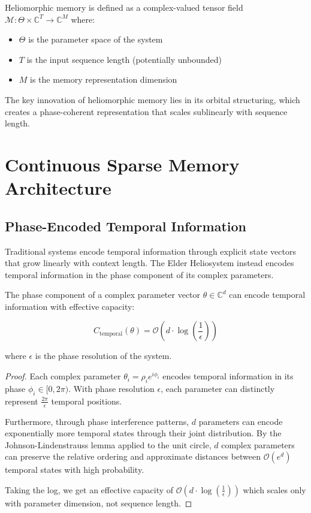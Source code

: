 \begin{definition}
Heliomorphic memory is defined as a complex-valued tensor field $\mathcal{M}: \Theta \times \mathbb{C}^T \rightarrow \mathbb{C}^M$ where:
\begin{itemize}
    \item $\Theta$ is the parameter space of the system
    \item $T$ is the input sequence length (potentially unbounded)
    \item $M$ is the memory representation dimension
\end{itemize}
\end{definition}

The key innovation of heliomorphic memory lies in its orbital structuring, which creates a phase-coherent representation that scales sublinearly with sequence length.

\section{Continuous Sparse Memory Architecture}

\subsection{Phase-Encoded Temporal Information}

Traditional systems encode temporal information through explicit state vectors that grow linearly with context length. The Elder Heliosystem instead encodes temporal information in the phase component of its complex parameters.

\begin{theorem}
The phase component of a complex parameter vector $\theta \in \mathbb{C}^d$ can encode temporal information with effective capacity:

\begin{equation}
C_{\text{temporal}}(\theta) = \mathcal{O}(d \cdot \log(\frac{1}{\epsilon}))
\end{equation}

where $\epsilon$ is the phase resolution of the system.
\end{theorem}

\begin{proof}
Each complex parameter $\theta_i = \rho_i e^{i\phi_i}$ encodes temporal information in its phase $\phi_i \in [0, 2\pi)$. With phase resolution $\epsilon$, each parameter can distinctly represent $\frac{2\pi}{\epsilon}$ temporal positions.

Furthermore, through phase interference patterns, $d$ parameters can encode exponentially more temporal states through their joint distribution. By the Johnson-Lindenstrauss lemma applied to the unit circle, $d$ complex parameters can preserve the relative ordering and approximate distances between $\mathcal{O}(e^{d})$ temporal states with high probability.

Taking the log, we get an effective capacity of $\mathcal{O}(d \cdot \log(\frac{1}{\epsilon}))$ which scales only with parameter dimension, not sequence length.
\end{proof}

